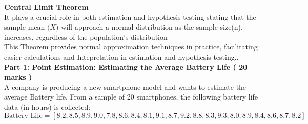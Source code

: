 \documentclass[a3paper,12pt]{extarticle} %
\begin{document}
    \subitem \textbf{Central Limit Theorem}
    \\ It plays a crucial role in both estimation and hypothesis testing stating that the sample mean \(\bar(X)\) will approach a normal distribution as the sample size(n), increases, regardless of the population's distribution
    \\ This Theorem provides normal approximation techniques in practice, facilitating easier calculations and Intepretation in estimation and hypothesis testing..
    \\ \subitem \textbf{Part 1: Point Estimation: Estimating the Average Battery Life ( 20 marks )}
    \\ A company is producing a new smartphone model and wants to estimate the average Battery life. From a sample of 20 smartphones, the following battery life data (in hours) is collected:
    \[
    \text{Battery Life} = [8.2, 8.5, 8.9, 9.0, 7.8, 8.6, 8.4, 8.1, 9.1, 8.7, 9.2, 8.8, 8.3, 9.3, 8.0, 8.9, 8.4, 8.6, 8.7, 8.2]
    \]
\end{document}
